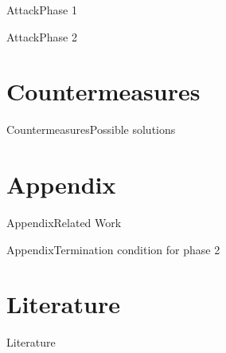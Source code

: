 \documentclass[aspectratio=169, hyperref={colorlinks=true, allcolors=SecondaryColor}, c]{beamer}
\begin{document}
\ifattackphaseone
	\begin{frame}[fragile]{Attack}{Phase 1}
		\begin{center}
			\begin{adjustbox}{scale=0.7}
				
			\end{adjustbox}
		\end{center}
	\end{frame}
\else
\fi

\ifattackphaseone
	\begin{frame}[fragile]{Attack}{Phase 2}
		\begin{center}
			\begin{adjustbox}{scale=0.7}
				
			\end{adjustbox}
		\end{center}
	\end{frame}
\else
\fi

\ifcountermeasures
	\section{Countermeasures}

	\begin{frame}[fragile]{Countermeasures}{Possible solutions}
	\end{frame}
\else
\fi

\ifappendix
	\section{Appendix}

	\begin{frame}[fragile]{Appendix}{Related Work}
	\end{frame}

	\begin{frame}[fragile]{Appendix}{Termination condition for phase 2}
	\end{frame}
\else
\fi

\ifliterature
	\section{Literature}

	\begin{frame}[allowframebreaks]{Literature}
		\printbibliography
	\end{frame}
\end{document}
